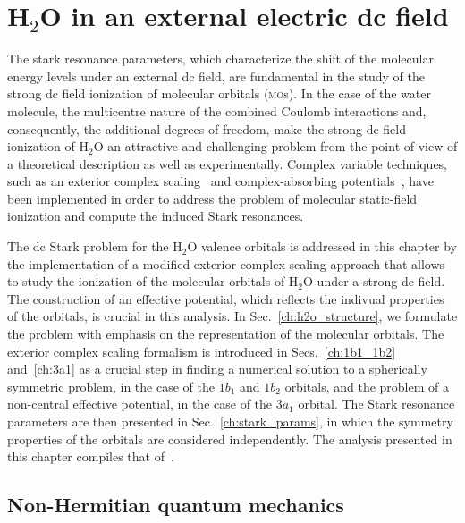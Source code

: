 \chapter{H$_{2}$O in an external electric dc field}
\label{ch:dc_h2o}


The stark resonance parameters, which characterize the shift of the
molecular energy levels under an external dc field, are fundamental in
the study of the strong dc field ionization of molecular orbitals
(\textsc{mo}s). In the case of the water molecule, the multicentre
nature of the combined Coulomb interactions and, consequently, the
additional degrees of freedom, make the strong dc field ionization of
H$_{2}$O an attractive and challenging problem from the point of view
of a theoretical description as well as experimentally. Complex
variable techniques, such as an exterior complex
scaling~\cite{Simon_1979,ecsScrinzi} and complex-absorbing
potentials~\cite{RissMeyer_1993,Krause_2014}, have been implemented in
order to address the problem of molecular static-field ionization and
compute the induced Stark resonances.

The dc Stark problem for the H$_{2}$O valence orbitals is addressed in
this chapter by the implementation of a modified exterior complex
scaling approach that allows to study the ionization of the molecular
orbitals of H$_{2}$O under a strong dc field. The construction of an
effective potential, which reflects the indivual properties of the
orbitals, is crucial in this analysis. In Sec.~\ref{ch:h2o_structure},
we formulate the problem with emphasis on the representation of the
molecular orbitals. The exterior complex scaling formalism is
introduced in Secs.~\ref{ch:1b1_1b2} and~\ref{ch:3a1} as a crucial
step in finding a numerical solution to a spherically symmetric
problem, in the case of the $1b_{1}$ and $1b_{2}$ orbitals, and the
problem of a non-central effective potential, in the case of the
$3a_{1}$ orbital. The Stark resonance parameters are then presented in
Sec.~\ref{ch:stark_params}, in which the symmetry properties of the
orbitals are considered independently. The analysis presented in this
chapter compiles that of~\cite{sarias_2016,sarias_2017}.


\section{Non-Hermitian quantum mechanics}
\label{ch:nonH_qm}

